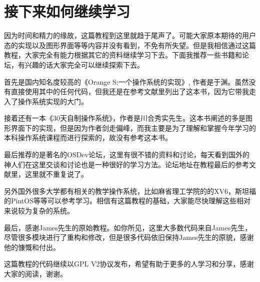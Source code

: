 
\section {接下来如何继续学习}

\par 因为时间和精力的缘故，这篇教程到这里就趋于尾声了。可能大家原本期待的用户态的实现以及图形界面等等内容并没有看到，不免有所失望。但是我相信通过这篇教程，大家完全有能力根据其它的资料继续学习下去。下面我推荐一些书籍和论坛，有兴趣的话大家完全可以继续探索下去。

\par 首先是国内知名度较高的《Orange S:一个操作系统的实现》, 作者是于渊。虽然没有直接使用其中的任何代码，但我还是在参考文献里列出了这本书，因为它带我走入了操作系统实现的大门。

\par 接着还有一本《30天自制操作系统》，作者是川合秀实先生。这本书阐述的多是图形界面下的实现，但是因为作者剑走偏峰，而我主要是为了理解和掌握今年学习的本科操作系统课程而进行探索的，故没有参考这本书。

\par 最后推荐的是著名的OSDev论坛，这里有很不错的资料和讨论，每天看到国外的神人们在这里交谈和讨论也是一种很好的学习方法。论坛地址在教程最后的参考文献里，这里就不重复说了。

\par 另外国外很多大学都有相关的教学操作系统，比如麻省理工学院的的XV6，斯坦福的PintOS等等可以参考学习。相信有这篇教程的基础，大家能尽快理解这些相对来说较为复杂的系统。

\par 最后，感谢James先生的原始教程。如你所见，这里大多数代码来自James先生，尽管很多模块进行了重构和修改，但是很多代码依旧保持James先生的原貌，感谢他的慷慨和付出。

\par 这篇教程的代码继续以GPL V2协议发布，希望有助于更多的人学习和分享，感谢大家的阅读，谢谢。

